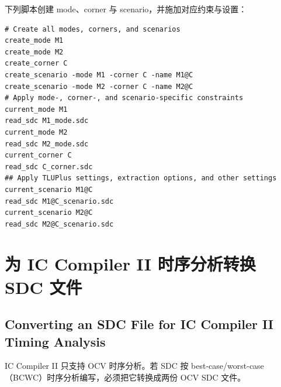 下列脚本创建 mode、corner 与 scenario，并施加对应约束与设置：
\begin{lstlisting}
# Create all modes, corners, and scenarios
create_mode M1
create_mode M2
create_corner C
create_scenario -mode M1 -corner C -name M1@C
create_scenario -mode M2 -corner C -name M2@C
# Apply mode-, corner-, and scenario-specific constraints
current_mode M1
read_sdc M1_mode.sdc
current_mode M2
read_sdc M2_mode.sdc
current_corner C
read_sdc C_corner.sdc
## Apply TLUPlus settings, extraction options, and other settings
current_scenario M1@C
read_sdc M1@C_scenario.sdc
current_scenario M2@C
read_sdc M2@C_scenario.sdc
\end{lstlisting}

\section{为 IC Compiler II 时序分析转换 SDC 文件}
\subsection*{Converting an SDC File for IC Compiler II Timing Analysis}

IC Compiler II 只支持 OCV 时序分析。若 SDC 按 best-case/worst-case（BCWC）时序分析编写，必须把它转换成两份 OCV SDC 文件。

